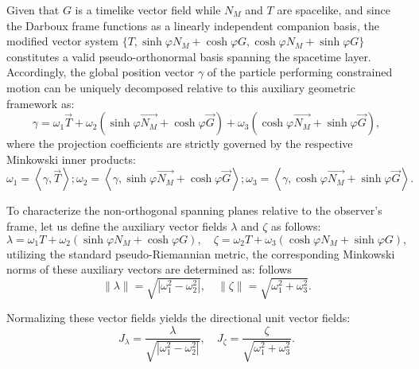 \documentclass[reqno]{amsart}
\theoremstyle{plain}
\numberwithin{equation}{section}
\begin{document}
Given that $G$ is a timelike vector field while $N_M$ and $T$ are spacelike, and since the Darboux frame functions as a linearly independent companion basis, the modified vector system $\{T, \sinh \varphi N_{M}+\cosh \varphi G, \cosh \varphi N_{M}+\sinh \varphi G\}$ constitutes a valid pseudo-orthonormal basis spanning the spacetime layer. Accordingly, the global position vector $\gamma$ of the particle performing constrained motion can be uniquely decomposed relative to this auxiliary geometric framework as:
\begin{equation}
\gamma =\omega _{1}\overrightarrow{T}+\omega _{2}\left( \sinh \varphi 
\overrightarrow{N_{M}}+\cosh \varphi \overrightarrow{G}\right) +\omega
_{3}\left( \cosh \varphi \overrightarrow{N_{M}}+\sinh \varphi 
\overrightarrow{G}\right) ,  \tag{3.7}
\end{equation}%
where the projection coefficients are strictly governed by the respective Minkowski inner products: 
\begin{equation}
\omega _{1}=\left\langle \gamma ,\overrightarrow{T}\right\rangle ;\omega
_{2}=\left\langle \gamma ,\sinh \varphi \overrightarrow{N_{M}}+\cosh \varphi 
\overrightarrow{G}\right\rangle ;\omega _{3}=\left\langle \gamma ,\cosh
\varphi \overrightarrow{N_{M}}+\sinh \varphi \overrightarrow{G}\right\rangle
.  \tag{3.8}
\end{equation}

To characterize the non-orthogonal spanning planes relative to the observer's frame, let us define the auxiliary vector fields $\lambda$ and $\zeta$ as follows:
\begin{equation}
\lambda = \omega_{1} T + \omega_{2} \left( \sinh \varphi N_{M} + \cosh \varphi G \right), \quad \zeta = \omega_{2} T + \omega_{3} \left( \cosh \varphi N_{M} + \sinh \varphi G \right), \tag{3.9}
\end{equation}
utilizing the standard pseudo-Riemannian metric, the corresponding Minkowski norms of these auxiliary vectors are determined as:
follows%
\begin{equation}
\|\lambda\| = \sqrt{\left|\omega_{1}^{2} - \omega_{2}^{2}\right|}, \quad \|\zeta\| = \sqrt{\omega_{1}^{2} + \omega_{3}^{2}}.  \tag{3.10}
\end{equation}%

Normalizing these vector fields yields the directional unit vector fields:
\begin{equation}
J_{\lambda} = \frac{\lambda}{\sqrt{\left|\omega_{1}^{2} - \omega_{2}^{2}\right|}}, \quad J_{\zeta} = \frac{\zeta}{\sqrt{\omega_{1}^{2} + \omega_{3}^{2}}}. \tag{3.11}
\end{equation}
\end{document}
